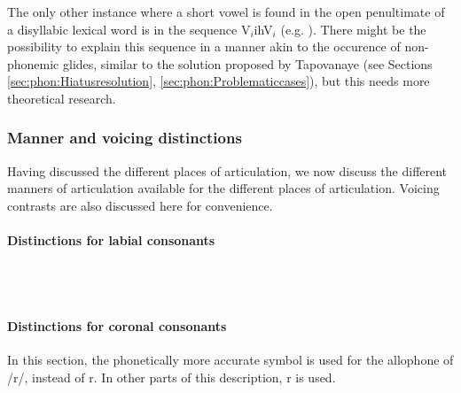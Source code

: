 The only other instance where a short vowel is found in the open penultimate of a disyllabic lexical word is in the sequence V$_i$ihV$_i$ (e.g. ). There might be the possibility to explain this sequence in a manner akin to the occurence of non-phonemic glides, similar to the solution proposed by Tapovanaye (see Sections \ref{sec:phon:Hiatusresolution}, \ref{sec:phon:Problematiccases}), but this needs more theoretical research.


 





\subsubsection{Manner and voicing distinctions}\label{sec:phon:Mannerandvoicingdistinctions}
Having discussed the different places of articulation, we now discuss the different manners of articulation available for the different places of articulation. Voicing contrasts are also discussed here for convenience.

\paragraph{Distinctions for labial consonants}
{~}\\
\\ 

\paragraph{Distinctions for coronal consonants}
In this section, the phonetically more accurate symbol  is used for the allophone of /r/, instead of r. In other parts of this description, r is used.

{~}\\
\\

